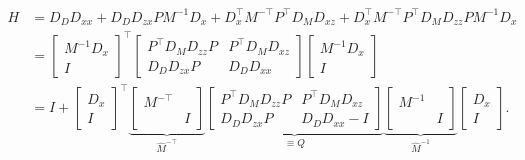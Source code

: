 \documentclass{article}
\begin{document}
\begin{align*}
    H & = D_DD_{xx}  + D_DD_{zx} PM^{-1} D_x + D_x^\top M^{-\top}P^\top D_M D_{xz}+D_x^\top M^{-\top}P^\top D_M D_{zz}P M^{-1}D_x \\
      & = \begin{bmatrix}
              M^{-1}D_x \\ I
          \end{bmatrix}
    ^\top
    \begin{bmatrix}
        P^\top D_M D_{zz} P & P^\top D_M D_{xz} \\
        D_D D_{zx} P        & D_D D_{xx}
    \end{bmatrix}
    \begin{bmatrix}
        M^{-1}D_x \\ I
    \end{bmatrix}
    \\
      & = I +  \begin{bmatrix}
                   D_x \\ I
               \end{bmatrix}
    ^\top
    \underbrace{\begin{bmatrix}
                        M^{-\top} & \\ & I
                    \end{bmatrix}
    }_{\hat{M}^{-\top}}
    \underbrace{
        \begin{bmatrix}
            P^\top D_M D_{zz} P & P^\top D_M D_{xz} \\
            D_D D_{zx} P        & D_D D_{xx}-I
        \end{bmatrix}
    }_{\equiv Q}
    \underbrace{\begin{bmatrix}
                        M^{-1} & \\ & I
                    \end{bmatrix}
    }_{\hat{M}^{-1}}
    \begin{bmatrix}
        D_x \\ I
    \end{bmatrix}
    .
\end{align*}
\end{document}

